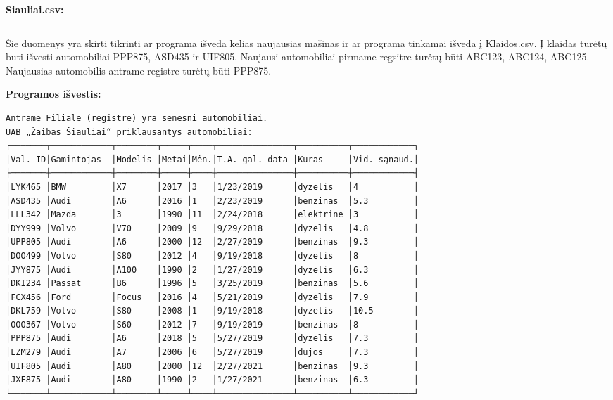 \documentclass{article}
\begin{document}
\inputminted{csharp}{Assets/L3/test2-input1.txt}

\begin{changemargin}{0cm}{0cm}
    \textbf{Siauliai.csv:}
\end{changemargin}

\inputminted{csharp}{Assets/L3/test2-input2.txt}

Šie duomenys yra skirti tikrinti ar programa išveda kelias naujausias mašinas ir ar programa tinkamai išveda į Klaidos.csv.
Į klaidas turėtų buti išvesti automobiliai PPP875, ASD435 ir UIF805.
Naujausi automobiliai pirmame regsitre turėtų būti ABC123, ABC124, ABC125.
Naujausias automobilis antrame registre turėtų būti PPP875.

\textbf{Programos išvestis:}

\footnotesize
\begin{verbatim}
Antrame Filiale (registre) yra senesni automobiliai.
UAB „Žaibas Šiauliai“ priklausantys automobiliai:
┌───────┬────────────┬────────┬─────┬────┬───────────────┬──────────┬────────────┐
│Val. ID│Gamintojas  │Modelis │Metai│Mėn.│T.A. gal. data │Kuras     │Vid. sąnaud.│
├───────┼────────────┼────────┼─────┼────┼───────────────┼──────────┼────────────┤
│LYK465 │BMW         │X7      │2017 │3   │1/23/2019      │dyzelis   │4           │
│ASD435 │Audi        │A6      │2016 │1   │2/23/2019      │benzinas  │5.3         │
│LLL342 │Mazda       │3       │1990 │11  │2/24/2018      │elektrine │3           │
│DYY999 │Volvo       │V70     │2009 │9   │9/29/2018      │dyzelis   │4.8         │
│UPP805 │Audi        │A6      │2000 │12  │2/27/2019      │benzinas  │9.3         │
│DOO499 │Volvo       │S80     │2012 │4   │9/19/2018      │dyzelis   │8           │
│JYY875 │Audi        │A100    │1990 │2   │1/27/2019      │dyzelis   │6.3         │
│DKI234 │Passat      │B6      │1996 │5   │3/25/2019      │benzinas  │5.6         │
│FCX456 │Ford        │Focus   │2016 │4   │5/21/2019      │dyzelis   │7.9         │
│DKL759 │Volvo       │S80     │2008 │1   │9/19/2018      │dyzelis   │10.5        │
│OOO367 │Volvo       │S60     │2012 │7   │9/19/2019      │benzinas  │8           │
│PPP875 │Audi        │A6      │2018 │5   │5/27/2019      │dyzelis   │7.3         │
│LZM279 │Audi        │A7      │2006 │6   │5/27/2019      │dujos     │7.3         │
│UIF805 │Audi        │A80     │2000 │12  │2/27/2021      │benzinas  │9.3         │
│JXF875 │Audi        │A80     │1990 │2   │1/27/2021      │benzinas  │6.3         │
└───────┴────────────┴────────┴─────┴────┴───────────────┴──────────┴────────────┘


\end{verbatim}
\end{document}
